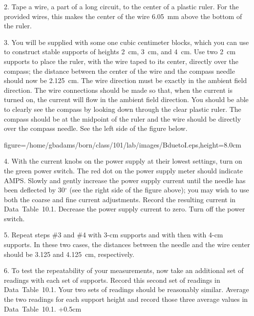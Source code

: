 \item{2.} Tape a wire, a part of a long circuit, to the center
of a plastic ruler.  For the provided wires, this makes the
center of the wire 6.05~mm above the bottom of the ruler.

\item{3.} You will be supplied with some one cubic centimeter
blocks, which you can use to construct stable supports of
heights 2~cm, 3~cm, and 4~cm.  Use two 2~cm supports to 
place the ruler, with the wire taped to its center, directly
over the compass; the distance between the center of the wire
and the compass needle should now be 2.125~cm.  The wire 
direction must be exactly in the ambient field direction.  
The wire connections should be made so that, when the 
current is turned on, the current will flow in the ambient 
field direction.  You should be able to clearly see the 
compass by looking down through the clear plastic ruler.  
The compass should be at the midpoint of the ruler and the 
wire should be directly over the compass needle.  See the 
left side of the figure below.
\smallskip
\centerline{\psfig
{figure=/home/gbadams/born/class/101/lab/images/BduetoI.eps,height=8.0cm}}
\smallskip
\item{4.} With the current knobs on the power supply at
their lowest settings, turn on the green power switch.
The red dot on the power supply meter should indicate
AMPS.  Slowly and gently increase the power supply current
until the needle has been deflected by 30$^\circ$ (see the
right side of the figure above); you may wish to use both
the coarse and fine current adjustments.  Record the
resulting current in Data~Table~10.1.  Decrease the power
supply current to zero.  Turn off the power switch.

\item{5.} Repeat steps \#3 and \#4 with 3-cm supports 
and with then with 4-cm supports.  In these two cases,
the distances between the needle and the wire center
should be 3.125 and 4.125~cm, respectively.

\item{6.} To test the repeatability of your measurements,
now take an additional set of readings with each set of
supports.  Record this second set of readings in 
Data~Table~10.1.  Your two sets of readings should be
reasonably similar.  Average the two readings for each
support height and record those three average values in 
Data~Table~10.1.
\vfil\eject
\vglue-0.5cm
\vglue-6.0cm
\vglue+0.5cm


